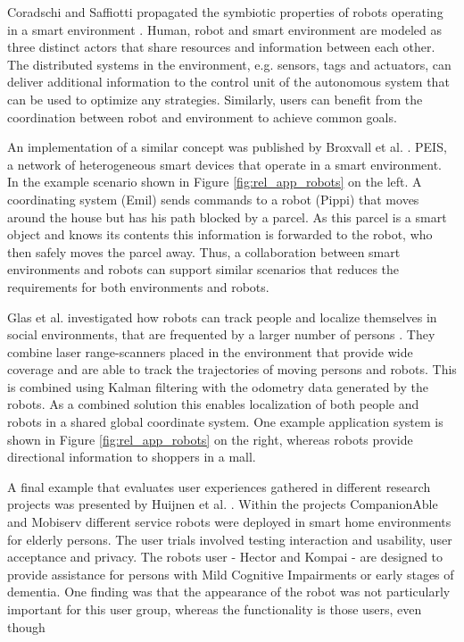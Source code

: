Coradschi and Saffiotti propagated the symbiotic properties of robots operating in a smart environment \cite{coradeschi2006symbiotic}. Human, robot and smart environment are modeled as three distinct actors that share resources and information between each other. The distributed systems in the environment, e.g. sensors, tags and actuators, can deliver additional information to the control unit of the autonomous system that can be used to optimize any strategies. Similarly, users can benefit from the coordination between robot and environment to achieve common goals.

An implementation of a similar concept was published by Broxvall et al. \cite{broxvall2006peis}. PEIS, a network of heterogeneous smart devices that operate in a smart environment. In the example scenario shown in Figure \ref{fig:rel_app_robots} on the left. A coordinating system (Emil) sends commands to a robot (Pippi) that moves around the house but has his path blocked by a parcel. As this parcel is a smart object and knows its contents this information is forwarded to the robot, who then safely moves the parcel away. Thus, a collaboration between smart environments and robots can support similar scenarios that reduces the requirements for both environments and robots.

Glas et al. investigated how robots can track people and localize themselves in social environments, that are frequented by a larger number of persons \cite{glas2009simultaneous}. They combine laser range-scanners placed in the environment that provide wide coverage and are able to track the trajectories of moving persons and robots. This is combined using Kalman filtering with the odometry data generated by the robots. As a combined solution this enables localization of both people and robots in a shared global coordinate system. One example application system is shown in Figure \ref{fig:rel_app_robots} on the right, whereas robots provide directional information to shoppers in a mall.

A final example that evaluates user experiences gathered in different research projects was presented by Huijnen et al.  \cite{huijnen2011maybe}. Within the projects CompanionAble and Mobiserv different service robots were deployed in smart home environments for elderly persons. The user trials involved testing interaction and usability, user acceptance and privacy. The robots user - Hector and Kompai - are designed to provide assistance for persons with Mild Cognitive Impairments or early stages of dementia. One finding was that the appearance of the robot was not particularly important for this user group, whereas the functionality is those users, even though


